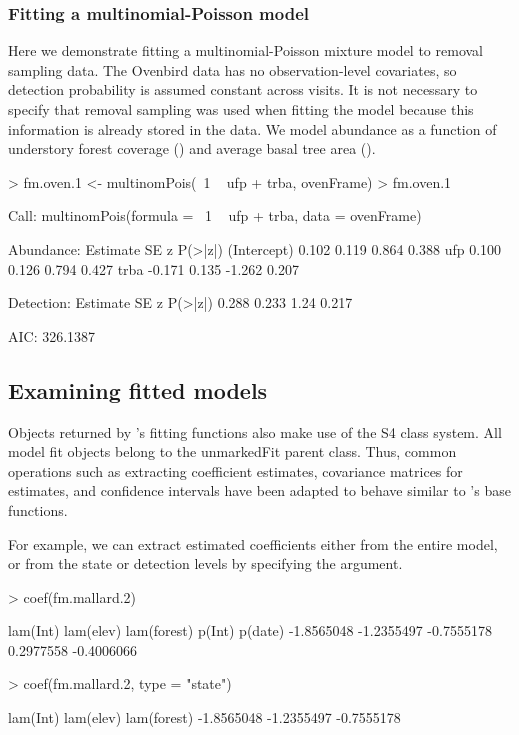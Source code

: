 \documentclass[article,shortnames]{jss}
\newcommand{\um}{\pkg{unmarked}}
\newcommand{\rlang}{\proglang{R}}
\begin{document}
\subsubsection{Fitting a multinomial-Poisson model}

Here we demonstrate fitting a multinomial-Poisson mixture model to removal 
sampling data.  The Ovenbird data has no observation-level covariates, so 
detection probability is assumed constant across visits.  It is not necessary
to specify that removal sampling was used when fitting the model
because this information is already stored in the  data.
We model abundance as a function of understory forest coverage ()
and average basal tree area ().

\begin{Schunk}
\begin{Sinput}
> fm.oven.1 <- multinomPois(~1 ~ ufp + trba, ovenFrame)
> fm.oven.1
\end{Sinput}
\begin{Soutput}
Call:
multinomPois(formula = ~1 ~ ufp + trba, data = ovenFrame)

Abundance:
            Estimate    SE      z P(>|z|)
(Intercept)    0.102 0.119  0.864   0.388
ufp            0.100 0.126  0.794   0.427
trba          -0.171 0.135 -1.262   0.207

Detection:
 Estimate    SE    z P(>|z|)
    0.288 0.233 1.24   0.217

AIC: 326.1387 
\end{Soutput}
\end{Schunk}


\subsection{Examining fitted models}
\label{sec:examining-model-fits}

Objects returned by \um's fitting functions also make use of the S4
class system.  All model fit objects belong to the unmarkedFit parent
class.  Thus, common operations such as extracting coefficient
estimates, covariance matrices for estimates, and confidence intervals
have been adapted to behave similar to \rlang's base functions.

For example, we can extract estimated coefficients either from the
entire model, or from the state or detection levels by specifying the
 argument.

\begin{Schunk}
\begin{Sinput}
> coef(fm.mallard.2)
\end{Sinput}
\begin{Soutput}
   lam(Int)   lam(elev) lam(forest)      p(Int)     p(date) 
 -1.8565048  -1.2355497  -0.7555178   0.2977558  -0.4006066 
\end{Soutput}
\begin{Sinput}
> coef(fm.mallard.2, type = "state")
\end{Sinput}
\begin{Soutput}
   lam(Int)   lam(elev) lam(forest) 
 -1.8565048  -1.2355497  -0.7555178 
\end{Soutput}
\end{Schunk}
\end{document}
